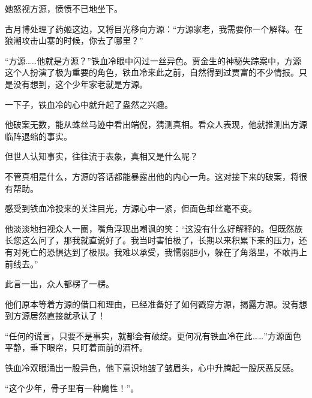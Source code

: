\begin{this_body}
她怒视方源，愤愤不已地坐下。

古月博处理了药姬这边，又将目光移向方源：“方源家老，我需要你一个解释。在狼潮攻击山寨的时候，你去了哪里？”

“方源……他就是方源？”铁血冷眼中闪过一丝异色。贾金生的神秘失踪案中，方源这个人扮演了极为重要的角色，铁血冷来此之前，自然得到过贾富的不少情报。只是没有想到，这个少年家老就是方源。

一下子，铁血冷的心中就升起了盎然之兴趣。

他破案无数，能从蛛丝马迹中看出端倪，猜测真相。看众人表现，他就推测出方源临阵退缩的事实。

但世人认知事实，往往流于表象，真相又是什么呢？

不管真相是什么，方源的答话都能暴露出他的内心一角。这对接下来的破案，将很有帮助。

感受到铁血冷投来的关注目光，方源心中一紧，但面色却丝毫不变。

他淡淡地扫视众人一圈，嘴角浮现出嘲讽的笑：“这没有什么好解释的。但既然族长您这么问了，那我就直说好了。我当时害怕极了，长期以来积累下来的压力，还有对死亡的恐惧达到了极限。我难以承受，我懦弱胆小，躲在了角落里，不敢再上前线去。”

此言一出，众人都楞了一楞。

他们原本等着方源的借口和理由，已经准备好了如何戳穿方源，揭露方源。没有想到方源居然直接就承认了！

“任何的谎言，只要不是事实，就都会有破绽。更何况有铁血冷在此……”方源面色平静，垂下眼帘，只盯着面前的酒杯。

铁血冷双眼涌出一股异色，他下意识地皱了皱眉头，心中升腾起一股厌恶反感。

“这个少年，骨子里有一种魔性！”。

\end{this_body}

